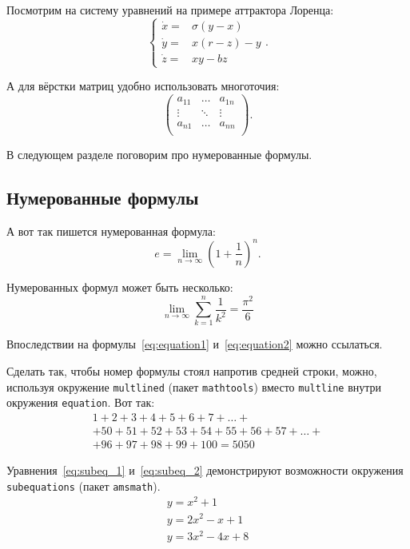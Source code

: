 \documentclass[14pt]{cmcmsuthesis-bachelor}
\begin{document}
Посмотрим на систему уравнений на примере аттрактора Лоренца:
\[\left\{
\begin{array}{rl}
    \dot x = & \sigma (y-x)  \\
    \dot y = & x (r - z) - y \\
    \dot z = & xy - bz
\end{array}\right..\]

А для вёрстки матриц удобно использовать многоточия:
\[\left(\begin{array}{ccc}
a_{11} & \ldots & a_{1n} \\
\vdots & \ddots & \vdots \\
a_{n1} & \ldots & a_{nn} \\
\end{array} \right).\]

В следующем разделе поговорим про нумерованные формулы.
\subsection{Нумерованные формулы}
\label{subsec:ch1/sec3/sub3}
А вот так пишется нумерованная формула:
\begin{equation}
\label{eq:equation1}
 e = \lim_{n \to \infty} \left( 1+\frac{1}{n} \right)^n.
\end{equation}

Нумерованных формул может быть несколько:
\begin{equation}
\label{eq:equation2}
\lim_{n \to \infty} \sum_{k=1}^n \frac{1}{k^2} = \frac{\pi^2}{6}
\end{equation}

Впоследствии на формулы~\eqref{eq:equation1} и~\eqref{eq:equation2} можно ссылаться.

Сделать так, чтобы номер формулы стоял напротив средней строки, можно, используя окружение \texttt{multlined} (пакет \texttt{mathtools}) вместо \texttt{multline} внутри окружения \texttt{equation}. Вот так:
\begin{equation}
\label{eq:equation3}
\begin{multlined}
        1+ 2+3+4+5+6+7+\dots + \\
        + 50+51+52+53+54+55+56+57 + \dots + \\
        + 96+97+98+99+100=5050
\end{multlined}
\end{equation}

Уравнения~\eqref{eq:subeq_1} и~\eqref{eq:subeq_2} демонстрируют возможности окружения \texttt{subequations} (пакет \texttt{amsmath}).
\begin{subequations}
\label{eq:subeq_1}
\begin{gather}
        y = x^2 + 1\label{eq:subeq_1-1} \\
        y = 2 x^2 - x + 1\label{eq:subeq_1-2} \\
        y = 3 x^2 - 4x + 8\label{eq:subeq_1-3}
    \end{gather}
\end{subequations}
\end{document}
